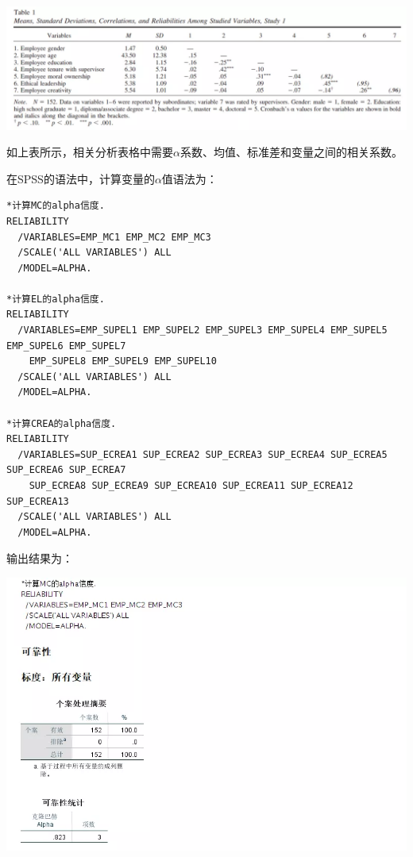\documentclass[
]{book}
\begin{document}
\includegraphics{figs/1311.png}

如上表所示，相关分析表格中需要\(\alpha\)系数、均值、标准差和变量之间的相关系数。

在SPSS的语法中，计算变量的\(\alpha\)值语法为：

\begin{verbatim}
*计算MC的alpha信度.
RELIABILITY
  /VARIABLES=EMP_MC1 EMP_MC2 EMP_MC3
  /SCALE('ALL VARIABLES') ALL
  /MODEL=ALPHA.

*计算EL的alpha信度.
RELIABILITY
  /VARIABLES=EMP_SUPEL1 EMP_SUPEL2 EMP_SUPEL3 EMP_SUPEL4 EMP_SUPEL5 EMP_SUPEL6 EMP_SUPEL7 
    EMP_SUPEL8 EMP_SUPEL9 EMP_SUPEL10
  /SCALE('ALL VARIABLES') ALL
  /MODEL=ALPHA.

*计算CREA的alpha信度.
RELIABILITY
  /VARIABLES=SUP_ECREA1 SUP_ECREA2 SUP_ECREA3 SUP_ECREA4 SUP_ECREA5 SUP_ECREA6 SUP_ECREA7 
    SUP_ECREA8 SUP_ECREA9 SUP_ECREA10 SUP_ECREA11 SUP_ECREA12 SUP_ECREA13
  /SCALE('ALL VARIABLES') ALL
  /MODEL=ALPHA.
\end{verbatim}

输出结果为：

\includegraphics{figs/1312.png}
\end{document}
